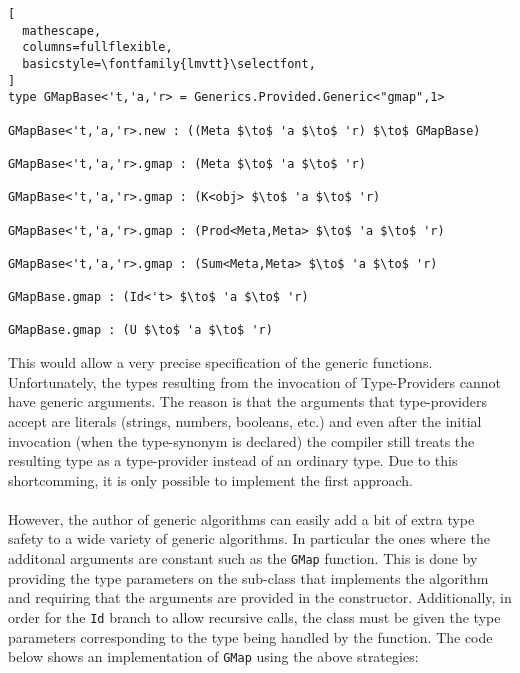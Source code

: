 \documentclass[8pt]{extarticle}
\begin{document}
\begin{lstlisting}[
  mathescape,
  columns=fullflexible,
  basicstyle=\fontfamily{lmvtt}\selectfont,
]
type GMapBase<'t,'a,'r> = Generics.Provided.Generic<"gmap",1>

GMapBase<'t,'a,'r>.new : ((Meta $\to$ 'a $\to$ 'r) $\to$ GMapBase)

GMapBase<'t,'a,'r>.gmap : (Meta $\to$ 'a $\to$ 'r)

GMapBase<'t,'a,'r>.gmap : (K<obj> $\to$ 'a $\to$ 'r)

GMapBase<'t,'a,'r>.gmap : (Prod<Meta,Meta> $\to$ 'a $\to$ 'r)

GMapBase<'t,'a,'r>.gmap : (Sum<Meta,Meta> $\to$ 'a $\to$ 'r)

GMapBase.gmap : (Id<'t> $\to$ 'a $\to$ 'r)

GMapBase.gmap : (U $\to$ 'a $\to$ 'r)
\end{lstlisting}
This would allow a very precise specification of the generic functions. Unfortunately, the types resulting from the invocation of Type-Providers cannot have generic arguments. The reason is that the arguments that type-providers accept are literals (strings, numbers, booleans, etc.) and even after the initial invocation (when the type-synonym is declared) the compiler still treats the resulting type as a type-provider instead of an ordinary type. Due to this shortcomming, it is only possible to implement the first approach.
\\\\
However, the author of generic algorithms can easily add a bit of extra type safety to a wide variety of generic algorithms. In particular the ones where the additonal arguments are constant such as the \verb+GMap+ function. This is done by providing the type parameters on the sub-class that implements the algorithm and requiring that the arguments are provided in the constructor. Additionally, in order for the \verb+Id+ branch to allow recursive calls, the class must be given the type parameters corresponding to the type being handled by the function. The code below shows an implementation of \verb+GMap+ using the above strategies:
\end{document}
